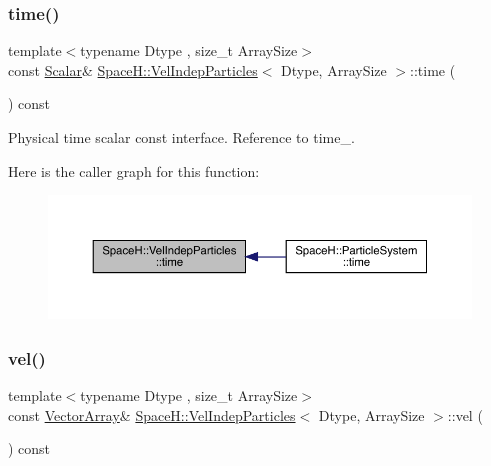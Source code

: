 \subsubsection{\texorpdfstring{time()}{time()}}
{\footnotesize\ttfamily template$<$typename Dtype , size\+\_\+t Array\+Size$>$ \\
const \mbox{\hyperlink{class_space_h_1_1_vel_indep_particles_aeb47d8131b30ed790320ff634f0d6af1}{Scalar}}\& \mbox{\hyperlink{class_space_h_1_1_vel_indep_particles}{Space\+H\+::\+Vel\+Indep\+Particles}}$<$ Dtype, Array\+Size $>$\+::time (\begin{DoxyParamCaption}{ }\end{DoxyParamCaption}) const\hspace{0.3cm}{\ttfamily [inline]}}



Physical time scalar const interface. Reference to time\+\_\+. 

Here is the caller graph for this function\+:
\nopagebreak
\begin{figure}[H]
\begin{center}
\leavevmode
\includegraphics[width=350pt]{class_space_h_1_1_vel_indep_particles_a417f0f6f338f78fac494a2f5bb471d1d_icgraph}
\end{center}
\end{figure}
\mbox{\label{class_space_h_1_1_vel_indep_particles_a3c096b30a541cd468d6fe5f9d138b3e5}} 
\subsubsection{\texorpdfstring{vel()}{vel()}\hspace{0.1cm}{\footnotesize\ttfamily [1/2]}}
{\footnotesize\ttfamily template$<$typename Dtype , size\+\_\+t Array\+Size$>$ \\
const \mbox{\hyperlink{class_space_h_1_1_vel_indep_particles_aa9983058940249df8b00fa800e8cbad2}{Vector\+Array}}\& \mbox{\hyperlink{class_space_h_1_1_vel_indep_particles}{Space\+H\+::\+Vel\+Indep\+Particles}}$<$ Dtype, Array\+Size $>$\+::vel (\begin{DoxyParamCaption}{ }\end{DoxyParamCaption}) const\hspace{0.3cm}{\ttfamily [inline]}}



